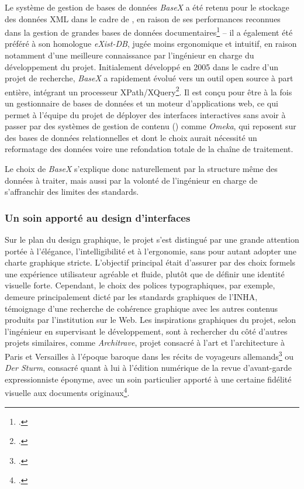 Le système de gestion de bases de données \textit{BaseX} a été retenu pour le stockage des données XML dans le cadre de \pense, en raison de ses performances reconnues dans la gestion de grandes bases de données documentaires\footcite{truica_forgotten_2021} – il a également été préféré à son homologue \textit{eXist-DB}, jugée moins ergonomique et intuitif, en raison notamment d’une meilleure connaissance par l’ingénieur en charge du développement du projet.  
Initialement développé en 2005 dans le cadre d’un projet de recherche, \textit{BaseX} a rapidement évolué vers un outil open source à part entière, intégrant un processeur XPath/XQuery\footcite{noauthor_BaseXgui_2019}. Il est conçu pour être à la fois un gestionnaire de bases de données et un moteur d’applications web, ce qui permet à l’équipe du projet \pense de déployer des interfaces interactives sans avoir à passer par des systèmes de gestion de contenu (\cms) comme \textit{Omeka}, qui reposent sur des bases de données relationnelles et dont le choix aurait nécessité un reformatage des données voire une refondation totale de la chaîne de traitement.

Le choix de \textit{BaseX} s’explique donc naturellement par la structure même des données à traiter, mais aussi par la volonté de l’ingénieur en charge de s’affranchir des limites des \cms standards.

\subsubsection{Un soin apporté au design d’interfaces}

Sur le plan du design graphique, le projet \pense s’est distingué par une grande attention portée à l’élégance, l’intelligibilité et à l’ergonomie, sans pour autant adopter une charte graphique stricte. L’objectif principal était d’assurer par des choix formels une expérience utilisateur agréable et fluide, plutôt que de définir une identité visuelle forte. Cependant, le choix des polices typographiques, par exemple, demeure principalement dicté par les standards graphiques de l’INHA, témoignage d’une recherche de cohérence graphique avec les autres contenus produits par l’institution sur le Web. Les inspirations graphiques du projet, selon l’ingénieur en supervisant le développement, sont à rechercher du côté d'autres projets similaires, comme \textit{Architrave}, projet consacré à l’art et l’architecture à Paris et Versailles à l’époque baroque dans les récits de voyageurs allemands\footcite{noauthor_architrave_nodate} ou \textit{Der Sturm}, consacré quant à lui à l'édition numérique de la revue d’avant-garde expressionniste éponyme, avec un soin particulier apporté à une certaine fidélité visuelle aux documents originaux\footcite{noauthor_startseite_nodate}.


